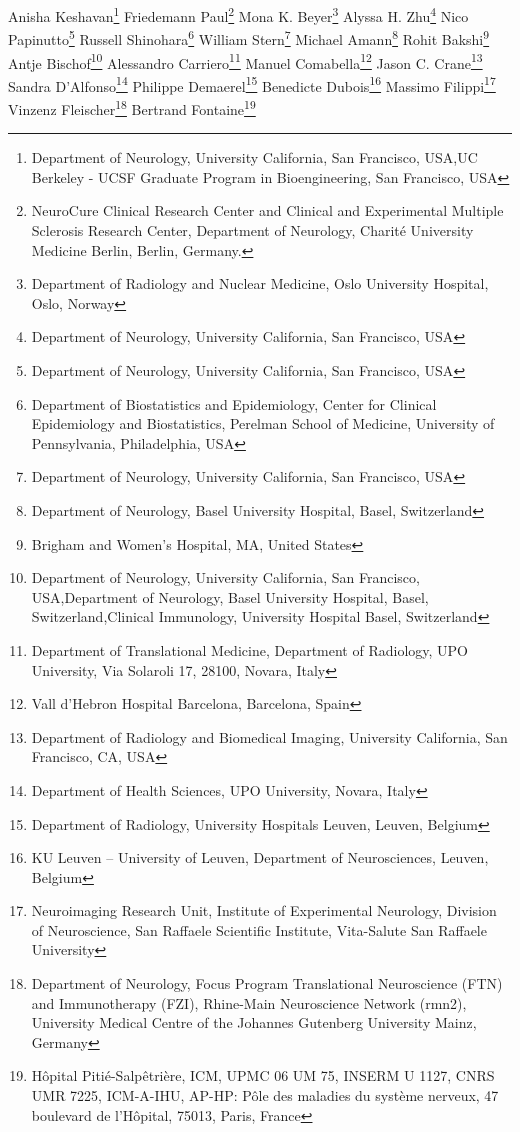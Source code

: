 \iflatexml
Anisha Keshavan\footnote[1,2]{Department of Neurology, University California, San Francisco,  USA,UC Berkeley - UCSF Graduate Program in Bioengineering, San Francisco, USA}
Friedemann Paul\footnote[3]{NeuroCure Clinical Research Center and Clinical and Experimental Multiple Sclerosis Research Center, Department of Neurology, Charité University Medicine Berlin, Berlin, Germany.}
Mona K. Beyer\footnote[4]{Department of Radiology and Nuclear Medicine, Oslo University Hospital, Oslo, Norway}
Alyssa H. Zhu\footnote[1]{Department of Neurology, University California, San Francisco,  USA}
Nico Papinutto\footnote[1]{Department of Neurology, University California, San Francisco,  USA}
Russell Shinohara\footnote[5]{Department of Biostatistics and Epidemiology, Center for Clinical Epidemiology and Biostatistics, Perelman School of Medicine, University of Pennsylvania, Philadelphia, USA}
William Stern\footnote[1]{Department of Neurology, University California, San Francisco,  USA}
Michael Amann\footnote[6]{Department of Neurology, Basel University Hospital, Basel, Switzerland}
Rohit Bakshi\footnote[7]{Brigham and Women's Hospital, MA, United States}
Antje Bischof\footnote[1,6,8]{Department of Neurology, University California, San Francisco,  USA,Department of Neurology, Basel University Hospital, Basel, Switzerland,Clinical Immunology, University Hospital Basel, Switzerland}
Alessandro Carriero\footnote[9]{Department of Translational Medicine, Department of Radiology,  UPO University, Via Solaroli 17, 28100, Novara, Italy}
Manuel Comabella\footnote[10]{Vall d’Hebron Hospital Barcelona, Barcelona, Spain}
Jason C. Crane\footnote[11]{Department of Radiology and Biomedical Imaging, University California, San Francisco, CA, USA}
Sandra D’Alfonso\footnote[12]{Department of Health Sciences, UPO University, Novara, Italy}
Philippe Demaerel\footnote[13]{Department of Radiology, University Hospitals Leuven, Leuven, Belgium}
Benedicte Dubois\footnote[14]{ KU Leuven – University of Leuven, Department of Neurosciences, Leuven, Belgium}
Massimo Filippi\footnote[15]{Neuroimaging Research Unit, Institute of Experimental Neurology, Division of Neuroscience, San Raffaele Scientific Institute, Vita-Salute San Raffaele University}
Vinzenz Fleischer\footnote[16]{Department of Neurology, Focus Program Translational Neuroscience (FTN) and Immunotherapy (FZI), Rhine-Main Neuroscience Network (rmn2), University Medical Centre of the Johannes Gutenberg University Mainz, Germany}
Bertrand Fontaine\footnote[17]{Hôpital Pitié-Salpêtrière, ICM, UPMC 06 UM 75, INSERM U 1127, CNRS UMR 7225, ICM-A-IHU, AP-HP: Pôle des maladies du système nerveux, 47 boulevard de l'Hôpital, 75013, Paris, France}
